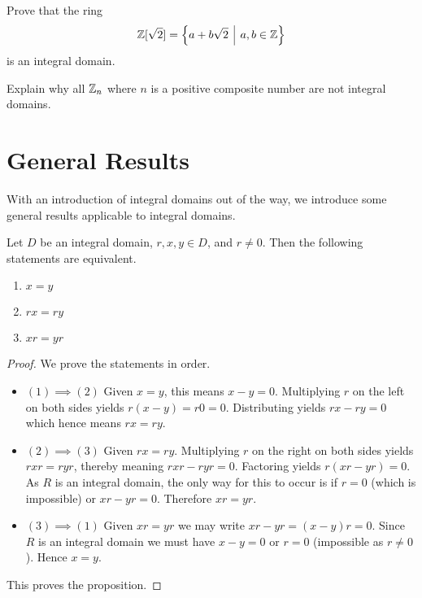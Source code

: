 \begin{exercise}
    Prove that the ring
    \[
        \Z[\sqrt2] = \left\{a + b\sqrt2 \vert a,b \in \Z\right\}
    \]
    is an integral domain.
\end{exercise}
\begin{exercise}
    Explain why all $\mathbb{Z}_n$ where $n$ is a positive composite number are not integral domains.
\end{exercise}

\section{General Results}
With an introduction of integral domains out of the way, we introduce some general results applicable to integral domains.
\begin{proposition}\label{prop-integral-domain-cancellation-law}
    Let $D$ be an integral domain, $r, x, y \in D$, and $r \neq 0$. Then the following statements are equivalent.
    \begin{enumerate}[label=(\arabic*)]
        \item $x = y$
        \item $rx = ry$
        \item $xr = yr$
    \end{enumerate}
\end{proposition}
\begin{proof}
    We prove the statements in order.
    \begin{itemize}
        \item $\boxed{(1) \implies (2)}$ Given $x = y$, this means $x - y = 0$. Multiplying $r$ on the left on both sides yields $r(x-y) = r0 = 0$. Distributing yields $rx - ry = 0$ which hence means $rx = ry$.
        
        \item $\boxed{(2) \implies (3)}$ Given $rx = ry$. Multiplying $r$ on the right on both sides yields $rxr = ryr$, thereby meaning $rxr - ryr = 0$. Factoring yields $r(xr - yr) = 0$. As $R$ is an integral domain, the only way for this to occur is if $r = 0$ (which is impossible) or $xr - yr = 0$. Therefore $xr = yr$.
        
        \item $\boxed{(3) \implies (1)}$ Given $xr = yr$ we may write $xr - yr = (x-y)r = 0$. Since $R$ is an integral domain we must have $x - y = 0$ or $r = 0$ (impossible as $r \neq 0$). Hence $x = y$.
    \end{itemize}
    This proves the proposition.
\end{proof}

